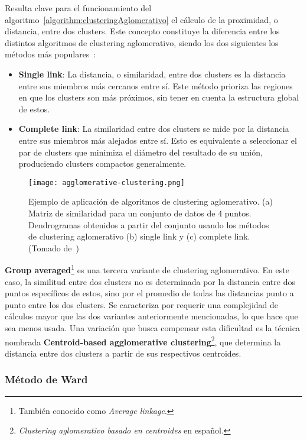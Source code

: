 Resulta clave para el funcionamiento del algoritmo~\ref{algorithm:clusteringAglomerativo} el cálculo de la proximidad, o distancia, entre dos clusters.
Este concepto constituye la diferencia entre los distintos algoritmos de clustering aglomerativo, siendo los dos siguientes los métodos más populares~\cite{Aggarawal13}:

\begin{itemize}
    \item \textbf{Single link}: La distancia, o similaridad, entre dos clusters es la distancia entre sus miembros más cercanos entre sí.
    Este método prioriza las regiones en que los clusters son más próximos, sin tener en cuenta la estructura global de estos.
    \item \textbf{Complete link}: La similaridad entre dos clusters se mide por la distancia entre sus miembros más alejados entre sí.
    Esto es equivalente a seleccionar el par de clusters que minimiza el diámetro del resultado de su unión, produciendo clusters compactos generalmente.
\end{itemize}

\begin{figure}[!h]
    \centering
    \texttt{[image: agglomerative-clustering.png]}
    \caption{Ejemplo de aplicación de algoritmos de clustering aglomerativo. (a) Matriz de similaridad para un conjunto de datos de 4 puntos.
    Dendrogramas obtenidos a partir del conjunto usando los métodos de clustering aglomerativo (b) single link y (c) complete link. (Tomado de~\cite{Aggarawal13})}
\end{figure}

\textbf{Group averaged}\footnote{También conocido como \textit{Average linkage}.} es una tercera variante de clustering aglomerativo.
En este caso, la similitud entre dos clusters no es determinada por la distancia entre dos puntos específicos de estos, sino por el promedio de todas las distancias punto a punto entre los dos clusters.
Se caracteriza por requerir una complejidad de cálculos mayor que las dos variantes anteriormente mencionadas, lo que hace que sea menos usada.
Una variación que busca compensar esta dificultad es la técnica nombrada \textbf{Centroid-based agglomerative clustering}\footnote{\textit{Clustering aglomerativo basado en centroides} en español.}, que determina la distancia entre dos clusters a partir de sus respectivos centroides.

\subsubsection{Método de Ward}


